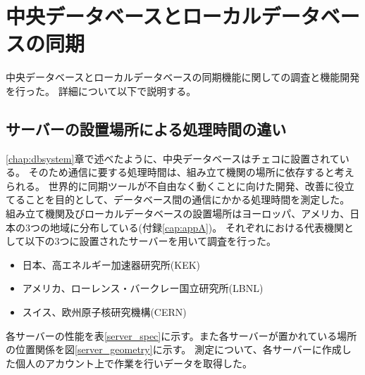 \chapter{中央データベースとローカルデータベースの同期}\label{chap:interfacing_tool}

中央データベースとローカルデータベースの同期機能に関しての調査と機能開発を行った。
詳細について以下で説明する。

\section{サーバーの設置場所による処理時間の違い}
\ref{chap:dbsystem}章で述べたように、中央データベースはチェコに設置されている。
そのため通信に要する処理時間は、組み立て機関の場所に依存すると考えられる。
世界的に同期ツールが不自由なく動くことに向けた開発、改善に役立てることを目的として、データベース間の通信にかかる処理時間を測定した。
組み立て機関及びローカルデータベースの設置場所はヨーロッパ、アメリカ、日本の3つの地域に分布している(付録\ref{cap:appA})。
それぞれにおける代表機関として以下の3つに設置されたサーバーを用いて調査を行った。

\begin{itemize}
  \item 日本、高エネルギー加速器研究所(KEK) 
  \item アメリカ、ローレンス・バークレー国立研究所\cite{7-2}(LBNL)
  \item スイス、欧州原子核研究機構(CERN)
\end{itemize}

各サーバーの性能を表\ref{server_spec}に示す。また各サーバーが置かれている場所の位置関係を図\ref{server_geometry}に示す。
測定について、各サーバーに作成した個人のアカウント上で作業を行いデータを取得した。

\begin{table}[tbp]
\caption[各ローカルデータベースサーバーの性能一覧]{各ローカルデータベースサーバーの性能一覧。今回の調査に利用したサーバーの性能を示す。KEK(日本)、LBNL(アメリカ)、CERN(スイス)に設置されたサーバーを用いた。}
\label{server_spec}
\end{table}

